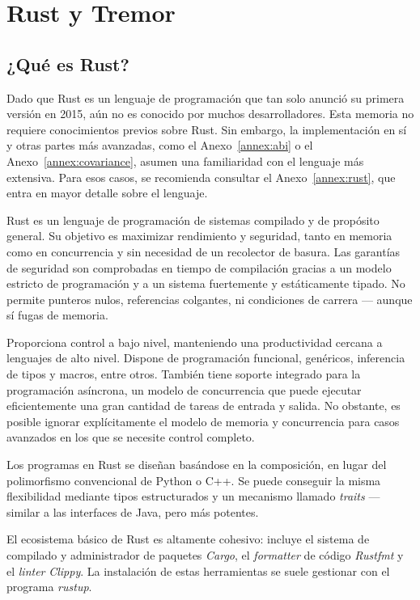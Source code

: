 
\chapter{Rust y Tremor}

\section{¿Qué es Rust?}\label{sec:rust}

Dado que Rust es un lenguaje de programación que tan solo anunció su primera
versión en 2015, aún no es conocido por muchos desarrolladores. Esta memoria no
requiere conocimientos previos sobre Rust. Sin embargo, la implementación en sí
y otras partes más avanzadas, como el Anexo~\ref{annex:abi} o el
Anexo~\ref{annex:covariance}, asumen una familiaridad con el lenguaje más
extensiva. Para esos casos, se recomienda consultar el Anexo~\ref{annex:rust},
que entra en mayor detalle sobre el lenguaje.

Rust es un lenguaje de programación de sistemas compilado y de propósito
general. Su objetivo es maximizar rendimiento y seguridad, tanto en memoria como
en concurrencia y sin necesidad de un recolector de basura. Las garantías de
seguridad son comprobadas en tiempo de compilación gracias a un modelo estricto
de programación y a un sistema fuertemente y estáticamente tipado. No permite
punteros nulos, referencias colgantes, ni condiciones de carrera --- aunque sí
fugas de memoria.

Proporciona control a bajo nivel, manteniendo una productividad cercana a
lenguajes de alto nivel. Dispone de programación funcional, genéricos,
inferencia de tipos y macros, entre otros. También tiene soporte integrado para
la programación asíncrona, un modelo de concurrencia que puede ejecutar
eficientemente una gran cantidad de tareas de entrada y salida. No obstante, es
posible ignorar explícitamente el modelo de memoria y concurrencia para casos
avanzados en los que se necesite control completo.

Los programas en Rust se diseñan basándose en la composición, en lugar del
polimorfismo convencional de Python o C++. Se puede conseguir la misma
flexibilidad mediante tipos estructurados y un mecanismo llamado \emph{traits}
--- similar a las interfaces de Java, pero más potentes.

El ecosistema básico de Rust es altamente cohesivo: incluye el sistema de
compilado y administrador de paquetes \emph{Cargo}, el \emph{formatter} de
código \emph{Rustfmt} y el \emph{linter} \emph{Clippy}. La instalación de estas
herramientas se suele gestionar con el programa \emph{rustup}.

